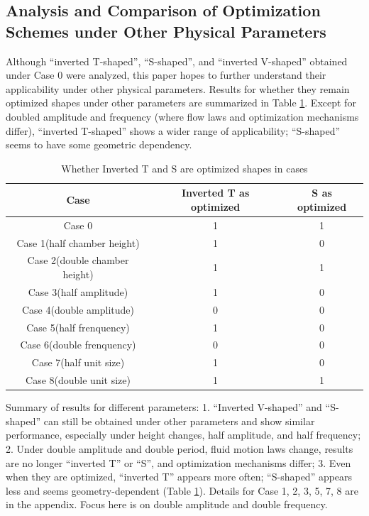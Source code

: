 \documentclass{article}
\begin{document}
\subsection{Analysis and Comparison of Optimization Schemes under Other Physical Parameters}\indent

Although ``inverted T-shaped'', ``S-shaped'', and ``inverted V-shaped'' obtained under Case 0 were analyzed,
this paper hopes to further understand their applicability under other physical parameters.
Results for whether they remain optimized shapes under other parameters are summarized in Table \ref{tab:whether_inverted_t_and_s_are_optimized_shapes_in_cases}.
Except for doubled amplitude and frequency (where flow laws and optimization mechanisms differ), ``inverted T-shaped'' shows a wider range of applicability; ``S-shaped'' seems to have some geometric dependency.

\begin{table}[h]
    \centering
    \caption{Whether Inverted T and S are optimized shapes in cases}
    \label{tab:whether_inverted_t_and_s_are_optimized_shapes_in_cases}
    \begin{tabular}{c c c}
        \hline
        \hline
        {Case}&{Inverted T as optimized}&{S as optimized}\\
        \hline
        {Case 0}&{1}&{1}\\
        \hline
        {Case 1(half chamber height)}&{1}&{0}\\
        \hline
        {Case 2(double chamber height)}&{1}&{1}\\
        \hline
        {Case 3(half amplitude)}&{1}&{0}\\
        \hline
        {Case 4(double amplitude)}&{0}&{0}\\
        \hline
        {Case 5(half frenquency)}&{1}&{0}\\
        \hline
        {Case 6(double frenquency)}&{0}&{0}\\
        \hline
        {Case 7(half unit size)}&{1}&{0}\\
        \hline
        {Case 8(double unit size)}&{1}&{1}\\
        \hline
        \hline
    \end{tabular}
\end{table}

Summary of results for different parameters: 1. ``Inverted V-shaped'' and ``S-shaped'' can still be obtained under other parameters and show similar performance, especially under height changes, half amplitude, and half frequency;
2. Under double amplitude and double period, fluid motion laws change, results are no longer ``inverted T'' or ``S'', and optimization mechanisms differ;
3. Even when they are optimized, ``inverted T'' appears more often; ``S-shaped'' appears less and seems geometry-dependent (Table \ref{tab:whether_inverted_t_and_s_are_optimized_shapes_in_cases}).
Details for Case 1, 2, 3, 5, 7, 8 are in the appendix.
Focus here is on double amplitude and double frequency.
\end{document}
